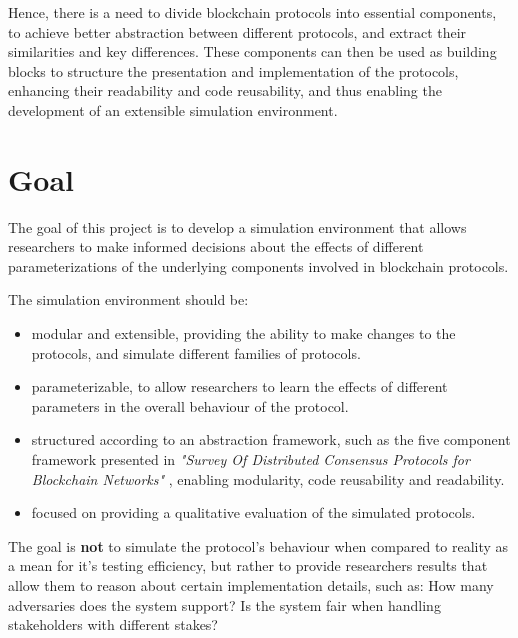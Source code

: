 Hence, there is a need to divide blockchain protocols into essential components, to achieve better abstraction between different protocols, and extract their similarities and key differences. These components can then be used as building blocks to structure the presentation and implementation of the protocols, enhancing their readability and code reusability, and thus enabling the development of an extensible simulation environment.



\section{Goal}

The goal of this project is to develop a simulation environment that allows researchers to make informed decisions about the effects of different parameterizations of the underlying components involved in blockchain protocols.

The simulation environment should be:

\begin{itemize}
  \item modular and extensible, providing the ability to make changes to the protocols, and simulate different families of protocols.
  \item parameterizable, to allow researchers to learn the effects of different parameters in the overall behaviour of the protocol.
  \item structured according to an abstraction framework, such as the five component framework presented in \textit{"Survey Of Distributed Consensus Protocols for Blockchain Networks"} \cite{survey_bchain_networks}, enabling modularity, code reusability and readability.
  \item focused on providing a qualitative evaluation of the simulated protocols.
\end{itemize}

The goal is \textbf{not} to simulate the protocol's behaviour when compared to reality as a mean for it's testing efficiency, but rather to provide researchers results that allow them to reason about certain implementation details, such as: How many adversaries does the system support? Is the system fair when handling stakeholders with different stakes?






